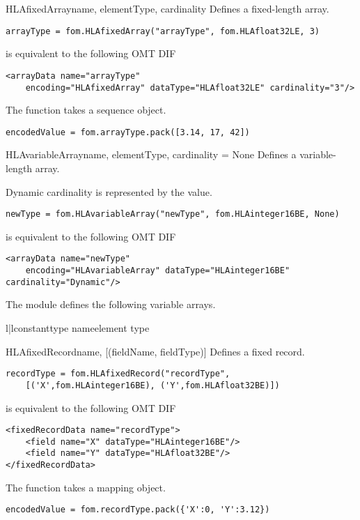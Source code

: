 \begin{classdesc}{HLAfixedArray}{name, elementType, cardinality}
Defines a fixed-length array.

\begin{verbatim}
arrayType = fom.HLAfixedArray("arrayType", fom.HLAfloat32LE, 3)
\end{verbatim}
is equivalent to the following OMT DIF
\begin{verbatim}
<arrayData name="arrayType"
    encoding="HLAfixedArray" dataType="HLAfloat32LE" cardinality="3"/>
\end{verbatim}

The  function takes a sequence object.
\begin{verbatim}
encodedValue = fom.arrayType.pack([3.14, 17, 42])
\end{verbatim}
\end{classdesc}

\begin{classdesc}{HLAvariableArray}{name, elementType, cardinality = None}
Defines a variable-length array.

Dynamic cardinality is represented by the  value.

\begin{verbatim}
newType = fom.HLAvariableArray("newType", fom.HLAinteger16BE, None)
\end{verbatim}
is equivalent to the following OMT DIF
\begin{verbatim}
<arrayData name="newType"
    encoding="HLAvariableArray" dataType="HLAinteger16BE" cardinality="Dynamic"/>
\end{verbatim}

The  module defines the following variable arrays.
\begin{tableii}{l|l}{constant}{type name}{element type}
\end{tableii}
\end{classdesc}

\begin{classdesc}{HLAfixedRecord}{name, [(fieldName, fieldType)]}
Defines a fixed record.

\begin{verbatim}
recordType = fom.HLAfixedRecord("recordType",
    [('X',fom.HLAinteger16BE), ('Y',fom.HLAfloat32BE)])
\end{verbatim}
is equivalent to the following OMT DIF
\begin{verbatim}
<fixedRecordData name="recordType">
    <field name="X" dataType="HLAinteger16BE"/>
    <field name="Y" dataType="HLAfloat32BE"/>
</fixedRecordData>
\end{verbatim}

The  function takes a mapping object.
\begin{verbatim}
encodedValue = fom.recordType.pack({'X':0, 'Y':3.12})
\end{verbatim}
\end{classdesc}

